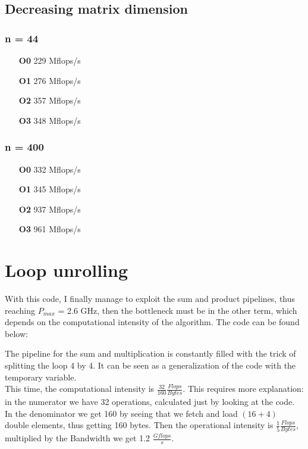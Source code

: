 \documentclass[11pt,a4paper,oneside,titlepage,openright]{book}
\begin{document}
\section{Decreasing matrix dimension} 

\subsection{ n = 44}
\begin{itemize}
\item[\textbf{O0}] 229  Mflops/s
\item[\textbf{O1}] 276 Mflops/s
\item[\textbf{O2}] 357 Mflops/s
\item[\textbf{O3}] 348 Mflops/s
\end{itemize}

\subsection{ n = 400}

\begin{itemize}
\item[\textbf{O0}] 332  Mflops/s
\item[\textbf{O1}] 345 Mflops/s
\item[\textbf{O2}] 937 Mflops/s
\item[\textbf{O3}] 961 Mflops/s
\end{itemize}



\chapter{Loop unrolling}
With this code, I finally manage to exploit the sum and product pipelines, thus reaching $P_{max}$ = 2.6 GHz, then the bottleneck must be in the other term, which depends on the computational intensity of the algorithm. 
The code can be found below: 


The pipeline for the sum and multiplication is constantly filled with the trick of splitting the loop 4 by 4. It can be seen as a generalization of the code with the temporary variable. \\
This time, the computational intensity is $\frac{32}{160}\frac{Flops}{Bytes}$. This requires more explanation: in the numerator we have 32 operations, calculated just by looking at the code. In the denominator we get 160 by seeing that we fetch and load $(16+4)$ double elements, thus getting 160 bytes. 
Then the operational intensity is $\frac{1}{5}\frac{Flops}{Bytes}$, multiplied by the Bandwidth we get 1.2 $\frac{Gflops}{s}$. 
\end{document}

